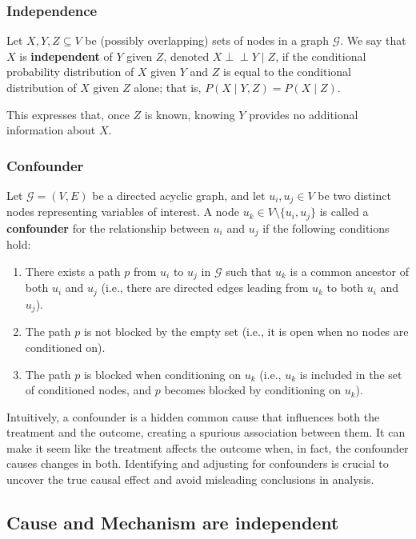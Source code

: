 \documentclass{article}
\newcommand{\indep}{\perp\!\!\!\!\perp}
\begin{document}
	\subsubsection*{Independence}
		
	Let $X, Y, Z \subseteq V$ be (possibly overlapping) sets of nodes in a graph $\mathcal{G}$. We say that $X$ is \textbf{independent} of $Y$ given $Z$, denoted $X \indep Y \mid Z$, if the conditional probability distribution of $X$ given $Y$ and $Z$ is equal to the conditional distribution of $X$ given $Z$ alone; that is, $P(X \mid Y, Z) = P(X \mid Z).$
	
	This expresses that, once $Z$ is known, knowing $Y$ provides no additional information about $X$.
	
	\subsubsection*{Confounder}
	
	Let $\mathcal{G} = (V, E)$ be a directed acyclic graph, and let $u_i, u_j \in V$ be two distinct nodes representing variables of interest. A node $u_k \in V \setminus \{u_i, u_j\}$ is called a \textbf{confounder} for the relationship between $u_i$ and $u_j$ if the following conditions hold:
	
	\begin{enumerate}
		\item There exists a path $p$ from $u_i$ to $u_j$ in $\mathcal{G}$ such that $u_k$ is a common ancestor of both $u_i$ and $u_j$ (i.e., there are directed edges leading from $u_k$ to both $u_i$ and $u_j$).
		\item The path $p$ is not blocked by the empty set (i.e., it is open when no nodes are conditioned on).
		\item The path $p$ is blocked when conditioning on $u_k$  (i.e., $u_k$ is included in the set of conditioned nodes, and $p$ becomes blocked by conditioning on $u_k$).
	\end{enumerate}
	
	Intuitively, a confounder is a hidden common cause that influences both the treatment and the outcome, creating a spurious association between them. It can make it seem like the treatment affects the outcome when, in fact, the confounder causes changes in both. Identifying and adjusting for confounders is crucial to uncover the true causal effect and avoid misleading conclusions in analysis.
	
	\subsection{Cause and Mechanism are independent}
	
\end{document}
